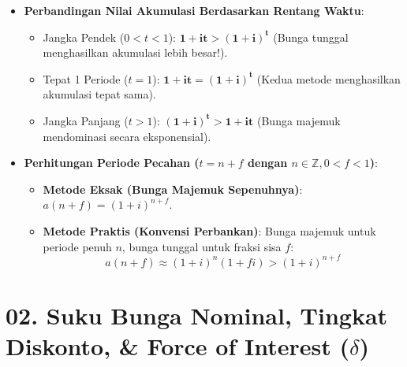 \documentclass[10pt,a4paper]{article}
\begin{document}
\begin{perhatianbox}
\begin{itemize}[leftmargin=1.5em, topsep=1.5pt, itemsep=2pt]
    \item \textbf{Perbandingan Nilai Akumulasi Berdasarkan Rentang Waktu}:
    \begin{itemize}[leftmargin=1.2em, topsep=1pt, itemsep=1.5pt]
        \item Jangka Pendek ($0 < t < 1$): $\mathbf{1 + it > (1+i)^t}$ (Bunga tunggal menghasilkan akumulasi lebih besar!).
        \item Tepat 1 Periode ($t = 1$): $\mathbf{1 + it = (1+i)^t}$ (Kedua metode menghasilkan akumulasi tepat sama).
        \item Jangka Panjang ($t > 1$): $\mathbf{(1+i)^t > 1 + it}$ (Bunga majemuk mendominasi secara eksponensial).
    \end{itemize}
    \item \textbf{Perhitungan Periode Pecahan ($t = n + f$ dengan $n \in \mathbb{Z}, 0 < f < 1$)}:
    \begin{itemize}[leftmargin=1.2em, topsep=1pt, itemsep=1.5pt]
        \item \textbf{Metode Eksak (Bunga Majemuk Sepenuhnya)}: $a(n+f) = (1+i)^{n+f}$.
        \item \textbf{Metode Praktis (Konvensi Perbankan)}: Bunga majemuk untuk periode penuh $n$, bunga tunggal untuk fraksi sisa $f$:
        \begin{equation*}
            a(n+f) \approx (1+i)^n (1 + fi) > (1+i)^{n+f}
        \end{equation*}
    \end{itemize}
\end{itemize}
\end{perhatianbox}

\section*{\large 02. Suku Bunga Nominal, Tingkat Diskonto, \& Force of Interest ($\delta$)}
\end{document}
